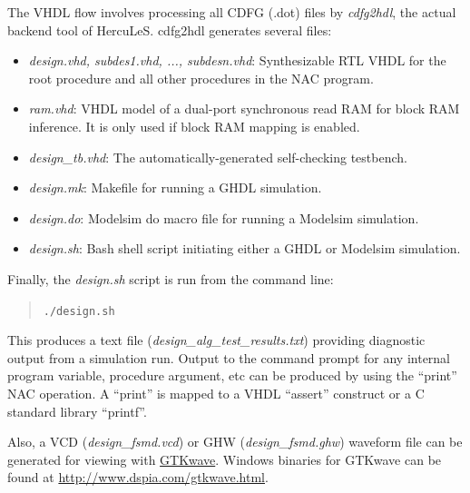 \documentclass[a4paper]{article}
\providecommand*{\DUroletitlereference}[1]{\textsl{#1}}
\begin{document}
The VHDL flow involves processing all CDFG (.dot) files by \emph{cdfg2hdl}, the
actual backend tool of HercuLeS. cdfg2hdl generates several files:
%
\begin{itemize}

\item \DUroletitlereference{design.vhd, subdes1.vhd, ..., subdesn.vhd}: Synthesizable RTL VHDL for the
root procedure and all other procedures in the NAC program.

\item \DUroletitlereference{ram.vhd}: VHDL model of a dual-port synchronous read RAM for block RAM
inference. It is only used if block RAM mapping is enabled.

\item \DUroletitlereference{design\_tb.vhd}: The automatically-generated self-checking testbench.

\item \DUroletitlereference{design.mk}: Makefile for running a GHDL simulation.

\item \DUroletitlereference{design.do}: Modelsim do macro file for running a Modelsim simulation.

\item \DUroletitlereference{design.sh}: Bash shell script initiating either a GHDL or Modelsim
simulation.

\end{itemize}

Finally, the \DUroletitlereference{design.sh} script is run from the command line:
%
\begin{quote}

\texttt{./design.sh}

\end{quote}

This produces a text file (\DUroletitlereference{design\_alg\_test\_results.txt}) providing diagnostic
output from a simulation run. Output to the command prompt for any internal
program variable, procedure argument, etc can be produced by using the ``print''
NAC operation. A ``print'' is mapped to a VHDL ``assert'' construct or a C standard
library ``printf''.

Also, a VCD (\DUroletitlereference{design\_fsmd.vcd}) or GHW (\DUroletitlereference{design\_fsmd.ghw}) waveform file can be
generated for viewing with \href{http://sourceforge.net/projects/gtkwave}{GTKwave}. Windows binaries for GTKwave can be found
at \url{http://www.dspia.com/gtkwave.html}.
\end{document}
